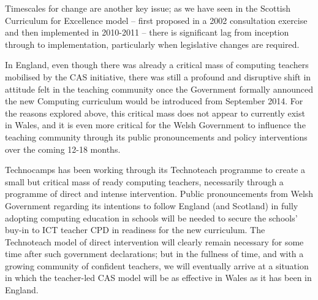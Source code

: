 \documentclass{sig-alternate}
\begin{document}
Timescales for change are another key issue; as we have seen in the
Scottish Curriculum for Excellence model -- first proposed in a 2002
consultation exercise and then implemented in 2010-2011 -- there is
significant lag from inception through to implementation, particularly
when legislative changes are required.

In England, even though there was already a critical mass of computing
teachers mobilised by the CAS initiative, there was still a profound
and disruptive shift in attitude felt in the teaching community once
the Government formally announced the new Computing curriculum would
be introduced from September 2014.  For the reasons explored above,
this critical mass does not appear to currently exist in Wales, and it
is even more critical for the Welsh Government to influence the
teaching community through its public pronouncements and policy
interventions over the coming 12-18 months.

Technocamps has been working through its Technoteach programme to
create a small but critical mass of ready computing teachers,
necessarily through a programme of direct and intense intervention.
Public pronouncements from Welsh Government regarding its intentions
to follow England (and Scotland) in fully adopting computing education
in schools will be needed to secure the schools' buy-in to ICT teacher
CPD in readiness for the new curriculum.  The Technoteach model of
direct intervention will clearly remain necessary for some time after
such government declarations; but in the fullness of time, and with a
growing community of confident teachers, we will eventually arrive at
a situation in which the teacher-led CAS model will be as effective in
Wales as it has been in England.





\end{document}
